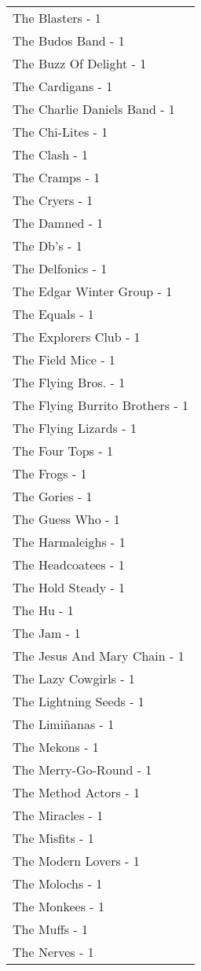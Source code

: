 \documentclass[
]{article}
\begin{document}
\begin{longtable}{l}
The Blasters - 1 \\ 
The Budos Band - 1 \\ 
The Buzz Of Delight - 1 \\ 
The Cardigans - 1 \\ 
The Charlie Daniels Band - 1 \\ 
The Chi-Lites - 1 \\ 
The Clash - 1 \\ 
The Cramps - 1 \\ 
The Cryers - 1 \\ 
The Damned - 1 \\ 
The Db's - 1 \\ 
The Delfonics - 1 \\ 
The Edgar Winter Group - 1 \\ 
The Equals - 1 \\ 
The Explorers Club - 1 \\ 
The Field Mice - 1 \\ 
The Flying Bros. - 1 \\ 
The Flying Burrito Brothers - 1 \\ 
The Flying Lizards - 1 \\ 
The Four Tops - 1 \\ 
The Frogs - 1 \\ 
The Gories - 1 \\ 
The Guess Who - 1 \\ 
The Harmaleighs - 1 \\ 
The Headcoatees - 1 \\ 
The Hold Steady - 1 \\ 
The Hu - 1 \\ 
The Jam - 1 \\ 
The Jesus And Mary Chain - 1 \\ 
The Lazy Cowgirls - 1 \\ 
The Lightning Seeds - 1 \\ 
The Limiñanas - 1 \\ 
The Mekons - 1 \\ 
The Merry-Go-Round - 1 \\ 
The Method Actors - 1 \\ 
The Miracles - 1 \\ 
The Misfits - 1 \\ 
The Modern Lovers - 1 \\ 
The Molochs - 1 \\ 
The Monkees - 1 \\ 
The Muffs - 1 \\ 
The Nerves - 1 \\ 

\end{longtable}
\end{document}
